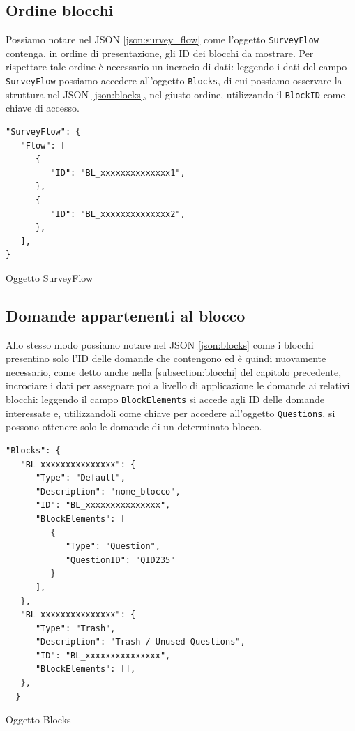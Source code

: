 \subsection{Ordine blocchi}
Possiamo notare nel JSON \ref{json:survey_flow} come l'oggetto \texttt{SurveyFlow} contenga, in ordine di presentazione, gli ID dei blocchi da mostrare. Per rispettare tale ordine è necessario un incrocio di dati: leggendo i dati del campo \texttt{SurveyFlow} possiamo accedere all'oggetto \texttt{Blocks}, di cui possiamo osservare la struttura nel JSON \ref{json:blocks}, nel giusto ordine, utilizzando il \texttt{BlockID} come chiave di accesso.

\begin{json}
\begin{verbatim}
"SurveyFlow": {
   "Flow": [
      {
         "ID": "BL_xxxxxxxxxxxxxx1",
      },
      {
         "ID": "BL_xxxxxxxxxxxxxx2",
      },
   ],
}
\end{verbatim}
\caption{Oggetto SurveyFlow}
\label{json:survey_flow}
\end{json}

\newpage
\subsection{Domande appartenenti al blocco}
Allo stesso modo possiamo notare nel JSON \ref{json:blocks} come i blocchi presentino solo l'ID delle domande che contengono ed è quindi nuovamente necessario, come detto anche nella \autoref{subsection:blocchi} del capitolo precedente, incrociare i dati per assegnare poi a livello di applicazione le domande ai relativi blocchi: leggendo il campo \texttt{BlockElements} si accede agli ID delle domande interessate e, utilizzandoli come chiave per accedere all'oggetto \texttt{Questions}, si possono ottenere solo le domande di un determinato blocco.

\begin{json}
\begin{verbatim}
"Blocks": {
   "BL_xxxxxxxxxxxxxxx": {
      "Type": "Default",
      "Description": "nome_blocco",
      "ID": "BL_xxxxxxxxxxxxxxx",
      "BlockElements": [
         {
            "Type": "Question",
            "QuestionID": "QID235"
         }
      ],
   },
   "BL_xxxxxxxxxxxxxxx": {
      "Type": "Trash",
      "Description": "Trash / Unused Questions",
      "ID": "BL_xxxxxxxxxxxxxxx",
      "BlockElements": [],
   },
  }
\end{verbatim}
\caption{Oggetto Blocks}
\label{json:blocks}
\end{json}

